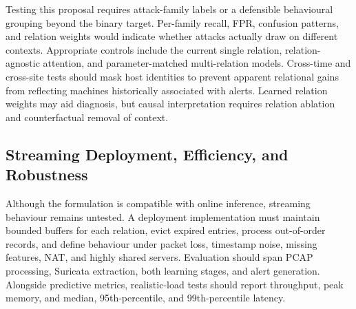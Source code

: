 \documentclass[11pt,fleqn]{report}
\begin{document}
Testing this proposal requires attack-family labels or a defensible behavioural grouping beyond the binary target. Per-family recall, FPR, confusion patterns, and relation weights would indicate whether attacks actually draw on different contexts. Appropriate controls include the current single relation, relation-agnostic attention, and parameter-matched multi-relation models. Cross-time and cross-site tests should mask host identities to prevent apparent relational gains from reflecting machines historically associated with alerts. Learned relation weights may aid diagnosis, but causal interpretation requires relation ablation and counterfactual removal of context.



\subsection{Streaming Deployment, Efficiency, and Robustness}
\label{subsubsec:future_streaming_deployment}

Although the formulation is compatible with online inference, streaming behaviour remains untested. A deployment implementation must maintain bounded buffers for each relation, evict expired entries, process out-of-order records, and define behaviour under packet loss, timestamp noise, missing features, NAT, and highly shared servers. Evaluation should span PCAP processing, Suricata extraction, both learning stages, and alert generation. Alongside predictive metrics, realistic-load tests should report throughput, peak memory, and median, 95th-percentile, and 99th-percentile latency.



\end{document}
